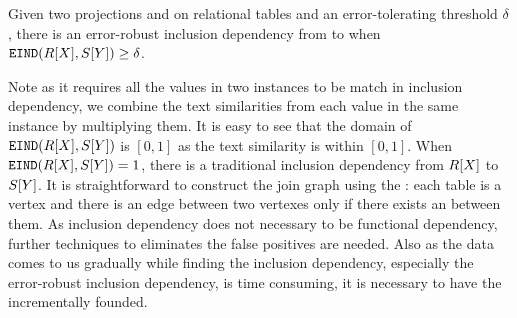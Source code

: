 \begin{definition}
Given two projections \RX and \SY on relational tables and an error-tolerating threshold $\delta$, there is an error-robust inclusion dependency from \X to \Y when $\texttt{EIND}(R[X],S[Y])\geq\delta$.
\end{definition}


Note as it requires all the values in two instances to be match in inclusion dependency, we combine the text  similarities from each value in the same instance by multiplying them. It is easy to see that the domain of $\texttt{EIND}(R[X],S[Y])$ is $[0,1]$ as the text similarity is within $[0,1]$. When $\texttt{EIND}(R[X],S[Y])=1$, there is a traditional inclusion dependency from $R[X]$ to $S[Y]$. It is straightforward to construct the join graph using the \eind: each table is a vertex and there is an edge between two vertexes only if there exists an \eind between them. As inclusion dependency does not necessary to be functional dependency, further techniques to eliminates the false positives are needed. Also as the data comes to us gradually while finding the inclusion dependency, especially the error-robust inclusion dependency, is time consuming, it is necessary to have the \eind incrementally founded. %










\iffalse
\subsection{Query the Join Graph}\label{subsec:query}

Once the join graph is constructed, the users can query it in various way. Among them, one of the most important one is to.

The essential way to query the join graph is taking several vertexes and find an subgraph containing all the query vertexes.

The user can specify several attributes which compose a \emph{query schema}. 

Given a collection of attributes, we aim to find a subgraph that contains all the corresponding vertexes. 

\fi